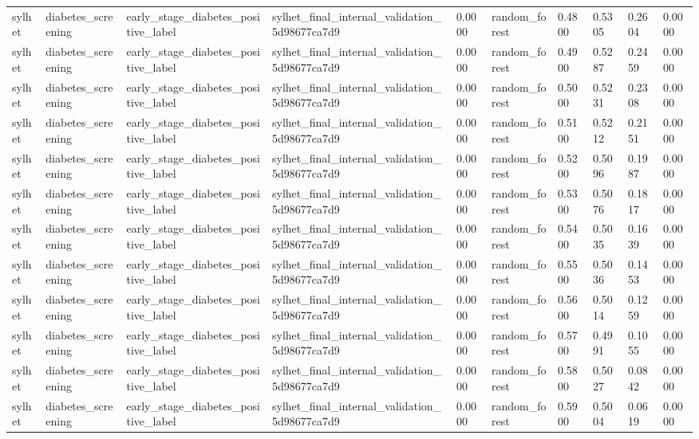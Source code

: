 \begin{tabular}{llllllllll}
sylhet & diabetes\_screening & early\_stage\_diabetes\_positive\_label & sylhet\_final\_internal\_validation\_5d98677ca7d9 & 0.0000 & random\_forest & 0.4800 & 0.5305 & 0.2604 & 0.0000 \\
sylhet & diabetes\_screening & early\_stage\_diabetes\_positive\_label & sylhet\_final\_internal\_validation\_5d98677ca7d9 & 0.0000 & random\_forest & 0.4900 & 0.5287 & 0.2459 & 0.0000 \\
sylhet & diabetes\_screening & early\_stage\_diabetes\_positive\_label & sylhet\_final\_internal\_validation\_5d98677ca7d9 & 0.0000 & random\_forest & 0.5000 & 0.5231 & 0.2308 & 0.0000 \\
sylhet & diabetes\_screening & early\_stage\_diabetes\_positive\_label & sylhet\_final\_internal\_validation\_5d98677ca7d9 & 0.0000 & random\_forest & 0.5100 & 0.5212 & 0.2151 & 0.0000 \\
sylhet & diabetes\_screening & early\_stage\_diabetes\_positive\_label & sylhet\_final\_internal\_validation\_5d98677ca7d9 & 0.0000 & random\_forest & 0.5200 & 0.5096 & 0.1987 & 0.0000 \\
sylhet & diabetes\_screening & early\_stage\_diabetes\_positive\_label & sylhet\_final\_internal\_validation\_5d98677ca7d9 & 0.0000 & random\_forest & 0.5300 & 0.5076 & 0.1817 & 0.0000 \\
sylhet & diabetes\_screening & early\_stage\_diabetes\_positive\_label & sylhet\_final\_internal\_validation\_5d98677ca7d9 & 0.0000 & random\_forest & 0.5400 & 0.5035 & 0.1639 & 0.0000 \\
sylhet & diabetes\_screening & early\_stage\_diabetes\_positive\_label & sylhet\_final\_internal\_validation\_5d98677ca7d9 & 0.0000 & random\_forest & 0.5500 & 0.5036 & 0.1453 & 0.0000 \\
sylhet & diabetes\_screening & early\_stage\_diabetes\_positive\_label & sylhet\_final\_internal\_validation\_5d98677ca7d9 & 0.0000 & random\_forest & 0.5600 & 0.5014 & 0.1259 & 0.0000 \\
sylhet & diabetes\_screening & early\_stage\_diabetes\_positive\_label & sylhet\_final\_internal\_validation\_5d98677ca7d9 & 0.0000 & random\_forest & 0.5700 & 0.4991 & 0.1055 & 0.0000 \\
sylhet & diabetes\_screening & early\_stage\_diabetes\_positive\_label & sylhet\_final\_internal\_validation\_5d98677ca7d9 & 0.0000 & random\_forest & 0.5800 & 0.5027 & 0.0842 & 0.0000 \\
sylhet & diabetes\_screening & early\_stage\_diabetes\_positive\_label & sylhet\_final\_internal\_validation\_5d98677ca7d9 & 0.0000 & random\_forest & 0.5900 & 0.5004 & 0.0619 & 0.0000 \\

\end{tabular}
